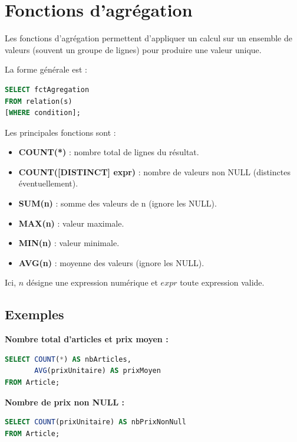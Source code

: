\section{Fonctions d’agrégation}

Les fonctions d’agrégation permettent d’appliquer un calcul sur un ensemble de valeurs (souvent un groupe de lignes) pour produire une valeur unique.

La forme générale est :

\begin{sqlcodebox}
\begin{lstlisting}[language=SQL]
SELECT fctAgregation
FROM relation(s)
[WHERE condition];
\end{lstlisting}
\end{sqlcodebox}

Les principales fonctions sont :

\begin{itemize}
    \item \textbf{COUNT(*)} : nombre total de lignes du résultat.
    \item \textbf{COUNT([DISTINCT] expr)} : nombre de valeurs non NULL (distinctes éventuellement).
    \item \textbf{SUM(n)} : somme des valeurs de n (ignore les NULL).
    \item \textbf{MAX(n)} : valeur maximale.
    \item \textbf{MIN(n)} : valeur minimale.
    \item \textbf{AVG(n)} : moyenne des valeurs (ignore les NULL).
\end{itemize}

Ici, $n$ désigne une expression numérique et $expr$ toute expression valide.

\subsection*{Exemples}

\textbf{Nombre total d’articles et prix moyen :}

\begin{sqlcodebox}
\begin{lstlisting}[language=SQL]
SELECT COUNT(*) AS nbArticles,
       AVG(prixUnitaire) AS prixMoyen
FROM Article;
\end{lstlisting}
\end{sqlcodebox}

\textbf{Nombre de prix non NULL :}

\begin{sqlcodebox}
\begin{lstlisting}[language=SQL]
SELECT COUNT(prixUnitaire) AS nbPrixNonNull
FROM Article;
\end{lstlisting}
\end{sqlcodebox}

